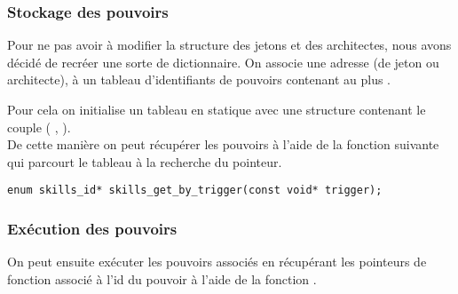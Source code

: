 \subsubsection*{Stockage des pouvoirs}
Pour ne pas avoir à modifier la structure des jetons et des architectes, nous avons décidé de recréer une sorte de dictionnaire. On associe une adresse (de jeton ou architecte), à un tableau d'identifiants de pouvoirs contenant au plus .

Pour cela on initialise un tableau en statique avec une structure contenant le couple ( , ). \\
De cette manière on peut récupérer les pouvoirs à l'aide de la fonction suivante qui parcourt le tableau à la recherche du pointeur. 

\begin{lstlisting}[frame=single, caption={Récupération des pouvoirs}]
enum skills_id* skills_get_by_trigger(const void* trigger);
\end{lstlisting}

\subsubsection*{Exécution des pouvoirs}

On peut ensuite exécuter les pouvoirs associés en récupérant les pointeurs de fonction associé à l'id du pouvoir à l'aide de la fonction .
